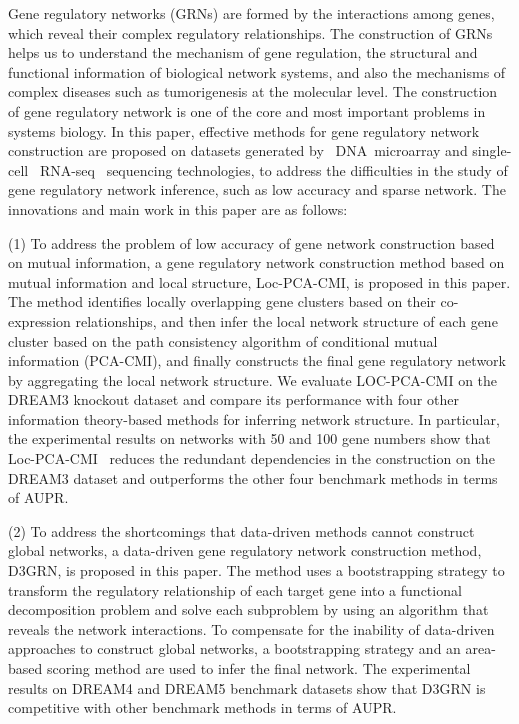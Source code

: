 \begin{abstracten}\setlength{\baselineskip}{20pt}

Gene regulatory networks (GRNs) are formed by the interactions among genes, 
which reveal their complex regulatory relationships. 
The construction of GRNs helps us to understand the mechanism of gene regulation, the structural and functional information of biological network systems, and also the mechanisms of complex diseases such as tumorigenesis at the molecular level.
The construction of gene regulatory network is one of the core and most important problems in systems biology.
In this paper, effective methods for gene regulatory network construction are proposed on datasets generated by ~DNA~microarray and single-cell ~RNA-seq~ sequencing technologies, 
to address  the difficulties in the study of gene regulatory network inference, such as low accuracy and sparse network.
The innovations and main work in this paper are as follows:

(1) To address the problem of low accuracy of gene network construction based on mutual information, 
a gene regulatory network construction method based on mutual information and local structure, Loc-PCA-CMI, is proposed in this paper. 
The method identifies locally overlapping gene clusters based on their co-expression relationships, and then infer the local network structure of each gene cluster based on the path consistency algorithm of conditional mutual information (PCA-CMI), 
and finally constructs the final gene regulatory network by aggregating the local network structure.
We evaluate LOC-PCA-CMI on the DREAM3 knockout dataset and compare its performance with four other information theory-based methods for inferring network structure.
In particular, the experimental results on networks with 50 and 100 gene numbers show that Loc-PCA-CMI~ reduces the redundant dependencies 
in the construction on the DREAM3 dataset and outperforms the other four benchmark methods in terms of AUPR.

(2) To address the shortcomings that data-driven methods cannot construct global networks, 
a data-driven gene regulatory network construction method, D3GRN, is proposed in this paper. 
The method uses a bootstrapping strategy to transform the regulatory relationship of each target gene into a functional decomposition problem and solve each subproblem by using an algorithm that reveals the network interactions. 
To compensate for the inability of data-driven approaches to construct global networks, 
a bootstrapping strategy and an area-based scoring method are used to infer the final network. 
The experimental results on DREAM4 and DREAM5 benchmark datasets show that D3GRN is competitive with other benchmark methods in terms of AUPR.



\end{abstracten}

